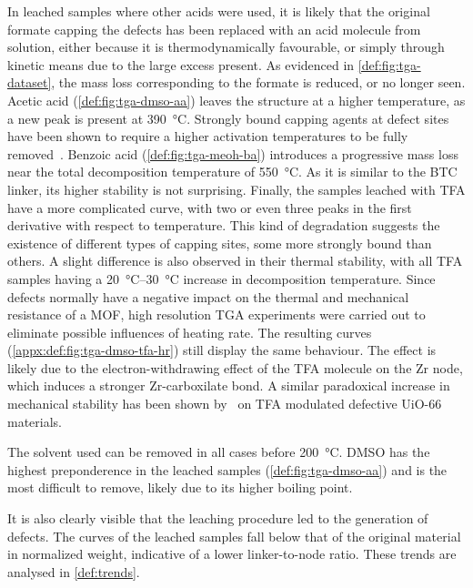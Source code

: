 In leached samples where other acids were used,
it is likely that the original formate capping the defects 
has been replaced with an acid molecule from solution,
either because it is thermodynamically favourable, or simply through 
kinetic means due to the large excess present.
As evidenced in \autoref{def:fig:tga-dataset}, the mass 
loss corresponding to the formate is reduced, or no longer seen. 
Acetic acid (\autoref{def:fig:tga-dmso-aa}) leaves the 
structure at a higher temperature, as
a new peak is present at \SI{390}{\degreeCelsius}. Strongly
bound capping agents at defect sites have been shown to 
require a higher activation temperatures to be fully
removed~\cite{jiaoHeatTreatmentDefectiveUiO662017}.
Benzoic acid (\autoref{def:fig:tga-meoh-ba}) introduces a progressive 
mass loss near the total decomposition temperature 
of \SI{550}{\degreeCelsius}.
As it is similar to the BTC linker, its higher stability
is not surprising. Finally, the samples leached with 
\gls{TFA} have a more complicated curve, with two or even 
three peaks in the first derivative with respect to temperature.
This kind of degradation suggests the existence of different types
of capping sites, some more strongly bound than others.
A slight difference is also observed in their thermal stability,
with all \gls{TFA} samples having a \SIrange{20}{30}{\degreeCelsius}
increase in decomposition temperature. Since defects normally
have a negative impact on the thermal and mechanical resistance 
of a \gls{MOF}, high resolution \gls{TGA} experiments were carried out
to eliminate possible influences of heating rate. The resulting
curves (\autoref{appx:def:fig:tga-dmso-tfa-hr}) still display 
the same behaviour. The effect is likely due to the
electron-withdrawing effect of the \gls{TFA} molecule on the Zr 
node, which induces a stronger Zr-carboxilate bond. A similar
paradoxical increase in mechanical stability has been shown 
by~\citet{vandevoordeImprovingMechanicalStability2015} on 
\gls{TFA} modulated defective UiO-66 materials.

The solvent used can be removed in all cases before 
\SI{200}{\degreeCelsius}. \gls{DMSO} has the highest
preponderence in the leached samples (\autoref{def:fig:tga-dmso-aa}) 
and is the most difficult to remove, likely due to its higher boiling point.

It is also clearly visible that the leaching procedure
led to the generation of defects. The curves 
of the leached samples fall below that of the original material
in normalized weight, indicative of a lower linker-to-node ratio.
These trends are analysed in \autoref{def:trends}.